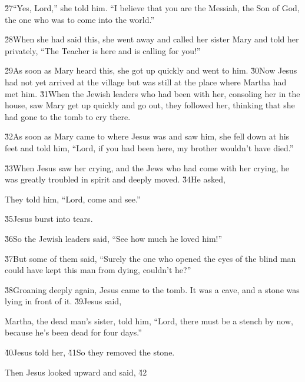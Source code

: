 \v{27}``Yes, Lord,'' she told him. ``I believe that you are the Messiah, the Son of God, the one who was to come into the world.''

\v{28}When she had said this, she went away and called her sister Mary and told her privately, ``The Teacher is here and is calling for you!''

\v{29}As soon as Mary heard this, she got up quickly and went to him. \v{30}Now Jesus had not yet arrived at the village but was still at the place where Martha had met him. \v{31}When the Jewish leaders who had been with her, consoling her in the house, saw Mary get up quickly and go out, they followed her, thinking that she had gone to the tomb to cry there.

\v{32}As soon as Mary came to where Jesus was and saw him, she fell down at his feet and told him, ``Lord, if you had been here, my brother wouldn't have died.''

\v{33}When Jesus saw her crying, and the Jews who had come with her crying, he was greatly troubled in spirit and deeply moved. \v{34}He asked, 

They told him, ``Lord, come and see.''

\v{35}Jesus burst into tears.

\v{36}So the Jewish leaders said, ``See how much he loved him!''

\v{37}But some of them said, ``Surely the one who opened the eyes of the blind man could have kept this man from dying, couldn't he?''

\v{38}Groaning deeply again, Jesus came to the tomb. It was a cave, and a stone was lying in front of it. \v{39}Jesus said, 

Martha, the dead man's sister, told him, ``Lord, there must be a stench by now, because he's been dead for four days.''

\v{40}Jesus told her,  \v{41}So they removed the stone.

Then Jesus looked upward and said,  \v{42}

